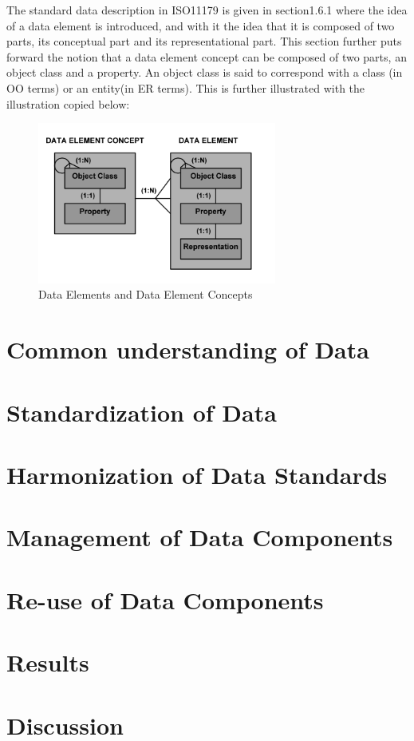 \documentclass{llncs}
\begin{document}
The standard data description in ISO11179 is given in section1.6.1 where the idea of a data element is introduced, and with it the idea that it is composed of two parts, its conceptual part and its representational part. This section further puts forward the notion that a data element concept can be composed of two parts, an object class and a property. An object class is said to correspond with a class (in OO terms) or an entity(in ER terms). This is further illustrated with the illustration copied below:

\begin{figure}[h]
\includegraphics[width=0.7\textwidth,natwidth=610,natheight=642]{figs/DataElementConcept}
\caption{Data Elements and Data Element Concepts} 
\label{fig:DEC}
\end{figure}





\section{Common understanding of Data}


\section{Standardization of Data}


\section{Harmonization of Data Standards}


\section{Management of Data Components}


\section{Re-use of Data Components}

\section{Results}

\section{Discussion}

 


\newpage




\end{document}
